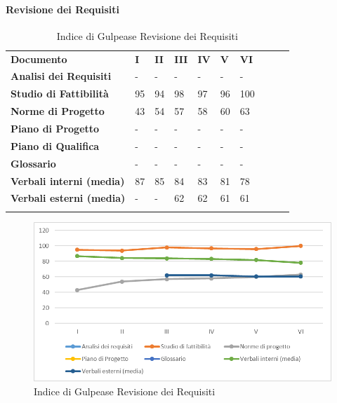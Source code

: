 		\paragraph{Revisione dei Requisiti} \mbox{} %
			\begin{longtable} {						
				>{}p{50mm}  		
				>{}p{8mm}		
				>{}p{8mm}		
				>{}p{8mm}		
				>{}p{8mm}		
				>{}p{8mm}		
				>{}p{8mm}
				>{}p{8mm}
				>{}p{8mm}
				>{}p{8mm}				
			}			
			\rowcolor{gray!50}
			\textbf{Documento} & \textbf{I} & \textbf{II} & \textbf{III} & \textbf{IV} & \textbf{V} & \textbf{VI} \TBstrut \\ [2mm]
			\textbf{Analisi dei Requisiti} & - & - & - & - & - & - \TBstrut \\ [2mm]
			\textbf{Studio di Fattibilità} & 95 & 94 & 98 & 97 & 96 & 100 \TBstrut \\ [2mm]
			\textbf{Norme di Progetto} & 43 & 54 & 57 & 58 & 60 & 63 \TBstrut \\ [2mm]
			\textbf{Piano di Progetto} & - & - & - & - & - & - \TBstrut \\ [2mm]
			\textbf{Piano di Qualifica} & - & - & - & - & - & - \TBstrut \\ [2mm]
			\textbf{Glossario} & - & - & - & - & - & - \TBstrut \\ [2mm]
			\textbf{Verbali interni (media)} & 87 & 85 & 84 & 83 & 81 & 78 \TBstrut \\ [2mm]
			\textbf{Verbali esterni (media)} & - & - & 62 & 62 & 61 & 61 \TBstrut \\ [2mm]
			\rowcolor{white}
			\caption{Indice di Gulpease Revisione dei Requisiti}
		\end{longtable}
	\begin{figure}[H] 	
		\includegraphics[width=\linewidth]{./img/grafici/2.png}	
		\caption{Indice di Gulpease Revisione dei Requisiti}	
	\end{figure}
		
